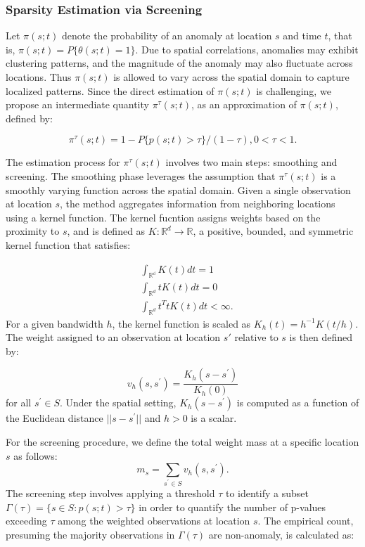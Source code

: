 \documentclass[11pt]{article}
\begin{document}
 

\subsubsection*{Sparsity Estimation via Screening}
Let $\pi(s;t)$ denote the probability of an anomaly at location $s$ and time $t$, that is, $\pi(s;t)=P\{\theta(s;t)=1\}$. Due to spatial correlations, anomalies may exhibit clustering patterns, and the magnitude of the anomaly may also fluctuate across locations. Thus $\pi(s;t)$ is allowed to vary across the spatial domain to capture localized patterns. Since the direct estimation of $\pi(s;t)$ is challenging, we propose an intermediate quantity $\pi^{\tau}(s;t)$, as an approximation of $\pi(s;t)$, defined by:

\begin{equation}
	\pi^{\tau}(s;t)=1-P\{p(s;t)>\tau\}/(1-\tau), 0<\tau<1.
\end{equation}

The estimation process for $\pi^{\tau}(s;t)$ involves two main steps: smoothing and screening. The smoothing phase leverages the assumption that $\pi^{\tau}(s;t)$ is a smoothly varying function across the spatial domain. Given a single observation at location $s$, the method aggregates information from neighboring locations using a kernel function. The kernel fucntion assigns weights based on the proximity to $s$, and is defined as $K:\mathbb{R}^d\rightarrow\mathbb{R}$, a positive, bounded, and symmetric kernel function that satisfies:

\begin{align}
	&\int_{\mathbb{R^d}}K(t)dt=1\\
	&\int_{\mathbb{R}^d}tK(t)dt=0\\
	&\int_{\mathbb{R}^d}t^{T}tK(t)dt<\infty.
\end{align}
For a given bandwidth $h$, the kernel function is scaled as $K_h(t)=h^{-1}K(t/h)$. The weight assigned to an observation at location $s'$ relative to $s$ is then defined by:


\begin{equation}
	v_h(s,s^{\prime})=\frac{K_h(s-s^{\prime})}{K_h(0)}
\end{equation}
for all $s^{\prime} \in S$. Under the spatial setting, $K_h(s-s^{\prime})$ is computed as a function of the Euclidean distance $||s-s^{\prime}||$ and $h>0$ is a scalar.

For the screening procedure,  we define the total weight mass at a specific location $s$ as follows:
\begin{equation}
	m_s=\sum_{s^{\prime}\in S}v_h(s,s^{\prime}).
\end{equation}
The screening step involves applying a threshold $\tau$ to identify a subset $\Gamma(\tau)=\{s\in S:p(s;t)>\tau\}$ in order to quantify the number of p-values exceeding $\tau$ among the weighted observations at location $s$. The empirical count, presuming the majority observations in $\Gamma(\tau)$ are non-anomaly, is calculated as:
 
\end{document}

